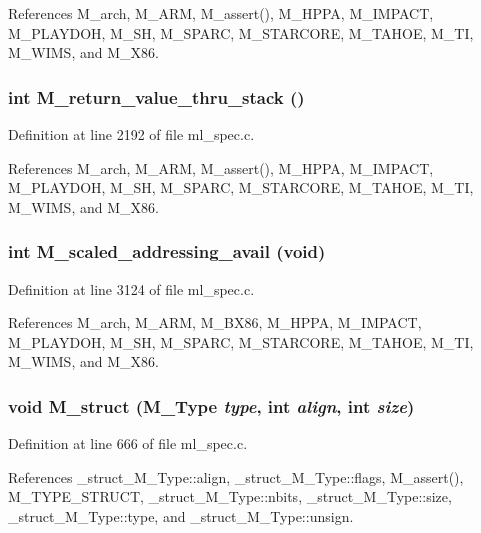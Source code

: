 References M\_\-arch, M\_\-ARM, M\_\-assert(), M\_\-HPPA, M\_\-IMPACT, M\_\-PLAYDOH, M\_\-SH, M\_\-SPARC, M\_\-STARCORE, M\_\-TAHOE, M\_\-TI, M\_\-WIMS, and M\_\-X86.
\subsubsection{\setlength{\rightskip}{0pt plus 5cm}int M\_\-return\_\-value\_\-thru\_\-stack ()}\label{ml__spec_8c_7bad6789a91fd4b1a419d09d79ec7c91}




Definition at line 2192 of file ml\_\-spec.c.

References M\_\-arch, M\_\-ARM, M\_\-assert(), M\_\-HPPA, M\_\-IMPACT, M\_\-PLAYDOH, M\_\-SH, M\_\-SPARC, M\_\-STARCORE, M\_\-TAHOE, M\_\-TI, M\_\-WIMS, and M\_\-X86.
\subsubsection{\setlength{\rightskip}{0pt plus 5cm}int M\_\-scaled\_\-addressing\_\-avail (void)}\label{ml__spec_8c_f0559708fe5ede7554b03c992054b109}




Definition at line 3124 of file ml\_\-spec.c.

References M\_\-arch, M\_\-ARM, M\_\-BX86, M\_\-HPPA, M\_\-IMPACT, M\_\-PLAYDOH, M\_\-SH, M\_\-SPARC, M\_\-STARCORE, M\_\-TAHOE, M\_\-TI, M\_\-WIMS, and M\_\-X86.
\subsubsection{\setlength{\rightskip}{0pt plus 5cm}void M\_\-struct (\bf{M\_\-Type} {\em type}, int {\em align}, int {\em size})}\label{ml__spec_8c_4eda1edc2e5bec85c084018921cb198d}




Definition at line 666 of file ml\_\-spec.c.

References \_\-struct\_\-M\_\-Type::align, \_\-struct\_\-M\_\-Type::flags, M\_\-assert(), M\_\-TYPE\_\-STRUCT, \_\-struct\_\-M\_\-Type::nbits, \_\-struct\_\-M\_\-Type::size, \_\-struct\_\-M\_\-Type::type, and \_\-struct\_\-M\_\-Type::unsign.
